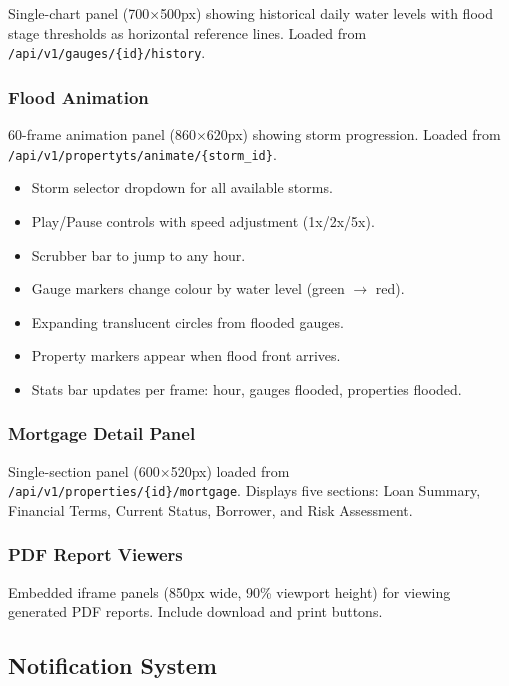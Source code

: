 \documentclass[11pt,a4paper]{article}
\begin{document}
Single-chart panel (700$\times$500px) showing historical daily water levels
with flood stage thresholds as horizontal reference lines. Loaded from
\texttt{/api/v1/gauges/\{id\}/history}.

\subsubsection{Flood Animation}

60-frame animation panel (860$\times$620px) showing storm progression.
Loaded from \texttt{/api/v1/propertyts/animate/\{storm\_id\}}.

\begin{itemize}[nosep]
    \item Storm selector dropdown for all available storms.
    \item Play/Pause controls with speed adjustment (1x/2x/5x).
    \item Scrubber bar to jump to any hour.
    \item Gauge markers change colour by water level (green $\to$ red).
    \item Expanding translucent circles from flooded gauges.
    \item Property markers appear when flood front arrives.
    \item Stats bar updates per frame: hour, gauges flooded, properties flooded.
\end{itemize}

\subsubsection{Mortgage Detail Panel}

Single-section panel (600$\times$520px) loaded from
\texttt{/api/v1/properties/\{id\}/mortgage}. Displays five sections: Loan
Summary, Financial Terms, Current Status, Borrower, and Risk Assessment.

\subsubsection{PDF Report Viewers}

Embedded iframe panels (850px wide, 90\% viewport height) for viewing
generated PDF reports. Include download and print buttons.

\subsection{Notification System}
\end{document}
